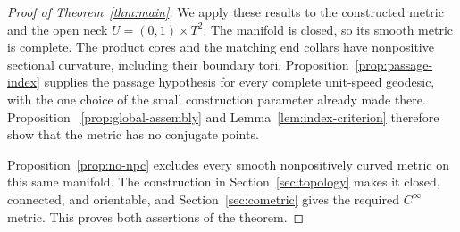 \begin{proof}[Proof of Theorem~\ref{thm:main}]
We apply these results to the constructed metric and the open neck
$U=(0,1)\times T^2$.  The manifold is closed, so its smooth metric is
complete.  The product cores and the matching end collars have
nonpositive sectional curvature, including their boundary tori.
Proposition~\ref{prop:passage-index} supplies the passage hypothesis for
every complete unit-speed geodesic, with the one choice of the small
construction parameter already made there.  Proposition~
\ref{prop:global-assembly} and Lemma~\ref{lem:index-criterion} therefore
show that the metric has no conjugate points.

Proposition~\ref{prop:no-npc} excludes every smooth nonpositively curved
metric on this same manifold. The construction in
Section~\ref{sec:topology} makes it closed, connected, and orientable,
and Section~\ref{sec:cometric} gives the required $C^\infty$ metric.
This proves both assertions of the theorem.
\end{proof}
